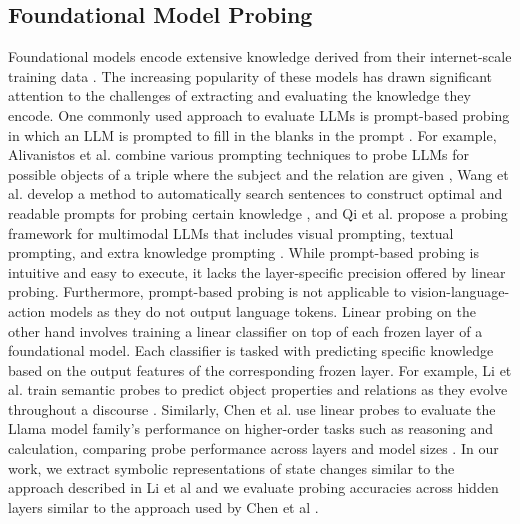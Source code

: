 \subsection{Foundational Model Probing}
Foundational models encode extensive knowledge derived from their internet-scale training data \cite{bommasani_opportunities_2022}. The increasing popularity of these models has drawn significant attention to the challenges of extracting and evaluating the knowledge they encode. One commonly used approach to evaluate LLMs is prompt-based probing in which an LLM is prompted to fill in the blanks in the prompt \cite{petroni_language_2019}. For example, Alivanistos et al. combine various prompting techniques to probe LLMs for possible objects of a triple where the subject and the relation are given \cite{alivanistos_prompting_2023}, Wang et al. develop a method to automatically search sentences to construct optimal and readable prompts for probing certain knowledge \cite{wang_readprompt_2023}, and Qi et al. propose a probing framework for multimodal LLMs that includes visual prompting, textual prompting, and extra knowledge prompting \cite{qi_what_2023}. While prompt-based probing is intuitive and easy to execute, it lacks the layer-specific precision offered by linear probing. Furthermore, prompt-based probing is not applicable to vision-language-action models as they do not output language tokens. Linear probing on the other hand involves training a linear classifier on top of each frozen layer of a foundational model. Each classifier is tasked with predicting specific knowledge based on the output features of the corresponding frozen layer. For example, Li et al. train semantic probes to predict object properties and relations as they evolve throughout a discourse \cite{li_implicit_2021}. Similarly, Chen et al. use linear probes to evaluate the Llama model family’s performance on higher-order tasks such as reasoning and calculation, comparing probe performance across layers and model sizes \cite{chen_is_2024}. In our work, we extract symbolic representations of state changes similar to the approach described in Li et al \cite{li_implicit_2021} and we evaluate probing accuracies across hidden layers similar to the approach used by Chen et al \cite{chen_is_2024}.